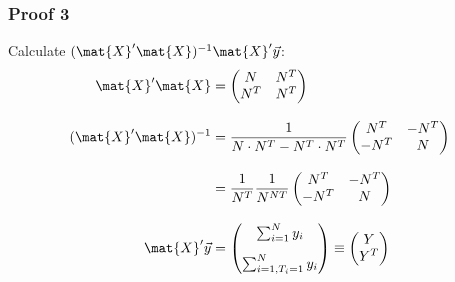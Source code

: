 \documentclass[mathserif, xcolor=table, svgnames]{beamer}
\begin{document}
\begin{frame}
  \frametitle{Proof 3}
  Calculate $(\mat{X}'\mat{X})^{-1} \mat{X}' \vec{y}$:
  \begin{align*}
    \mat{X}'\mat{X}
    & =
      \begin{pmatrix}
        N & N^{T} \\ N^{T} & N^{T}\\
      \end{pmatrix}
    \\[2ex]
    (\mat{X}'\mat{X})^{-1}
    & = 
      \frac{1}{N\cdot N^{T} - N^{T} \cdot N^{T}}
      \begin{pmatrix}
        N^{T} & -N^{T} \\ -N^{T} & N\\
      \end{pmatrix}
    \\[2ex]
    & =
      \frac{1}{N^{T}} \frac{1}{N^{NT}}
      \begin{pmatrix}
        N^{T} & -N^{T} \\ -N^{T} & N\\
      \end{pmatrix}
    \\[2ex]
    \mat{X}' \vec{y} 
    &=
      \begin{pmatrix}
        \sum_{i=1}^{N} y_{i} \\[2ex]
        \sum_{i=1, T_{i} = 1}^{N} y_{i} \\
      \end{pmatrix}
    \equiv
      \begin{pmatrix}
        Y \\ Y^{T}
      \end{pmatrix}
  \end{align*}
\end{frame}
  
\end{document}
